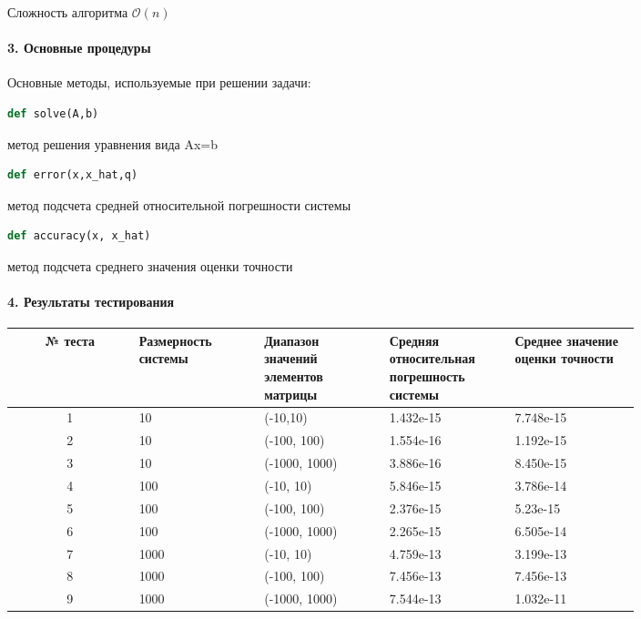 \documentclass[11pt,a4paper,twoside]{report}
\begin{document}
Сложность алгоритма $\mathcal{O}(n)$ 
\paragraph{3. Основные процедуры}
Основные методы, используемые при решении задачи:


\begin{lstlisting}[language=Python]
def solve(A,b)
\end{lstlisting}
метод решения уравнения вида Ax=b
\begin{lstlisting}[language=Python]
def error(x,x_hat,q)
\end{lstlisting}
метод подсчета средней относительной погрешности системы
\begin{lstlisting}[language=Python]
def accuracy(x, x_hat)
\end{lstlisting}
метод подсчета среднего значения оценки точности
\paragraph{4. Результаты тестирования}

\begin{center}
	\begin{tabular}{|c|p{0.2\linewidth}|p{0.2\linewidth}|p{0.2\linewidth}|p{0.2\linewidth}|}
		\hline
		№ теста & Размерность системы & Диапазон значений элементов матрицы  & Средняя относительная погрешность системы & Среднее значение оценки точности \\
		\hline
		1 & 10 & (-10,10) & 1.432e-15 & 7.748e-15  \\
		\hline
		2 & 10 & (-100, 100) & 1.554e-16 & 1.192e-15 \\
		\hline
		3 & 10 & (-1000, 1000) & 3.886e-16 & 8.450e-15 \\
		\hline
		4 & 100 & (-10, 10) & 5.846e-15 & 3.786e-14 \\
		\hline
		5 & 100 & (-100, 100) & 2.376e-15 & 5.23e-15 \\
		\hline
		6 & 100 & (-1000, 1000) & 2.265e-15 & 6.505e-14 \\
		\hline
		7 & 1000 & (-10, 10) & 4.759e-13 & 3.199e-13 \\
		\hline
		8 & 1000 & (-100, 100) & 7.456e-13 & 7.456e-13 \\
		\hline
		9 & 1000 & (-1000, 1000) & 7.544e-13 & 1.032e-11 \\
		\hline
	\end{tabular}	
\end{center}
\end{document}
